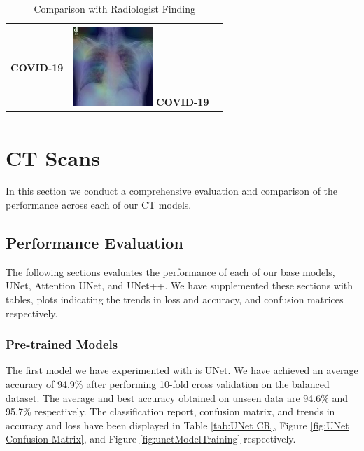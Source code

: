 \begin{longtable} { | c | c | c | }
\begin{minipage}{.3\textwidth}
           \centering  COVID-19
               \vspace{0.5em}
    \end{minipage}
    & 
    \begin{minipage}{.3\textwidth}
        \vspace{1em}
      \includegraphics[width=\linewidth, height=30mm]{Images/covid19Heatmap2.jpg}
      \centering COVID-19
          \vspace{0.5em}
    \end{minipage}
    \\ \hline
  \caption{Comparison with Radiologist Finding}\label{tab:radioFinding}
\end{longtable}



\section{CT Scans}

In this section we conduct a comprehensive evaluation and comparison of the performance across each of our CT models.
    \vspace{-1em}
\subsection{Performance Evaluation}

The following sections evaluates the performance of each of our base models, UNet, Attention UNet, and UNet++. We have supplemented these sections with tables, plots indicating the trends in loss and accuracy, and confusion matrices respectively. 
    \vspace{-1em}

\subsubsection{Pre-trained Models}

The first model we have experimented with is UNet. We have achieved an average accuracy of 94.9\% after performing 10-fold cross validation on the balanced dataset. The average and best accuracy obtained on unseen data are 94.6\% and 95.7\% respectively. The classification report, confusion matrix, and trends in accuracy and loss have been displayed in Table \ref{tab:UNet CR}, Figure \ref{fig:UNet Confusion Matrix}, and Figure \ref{fig:unetModelTraining} respectively.

